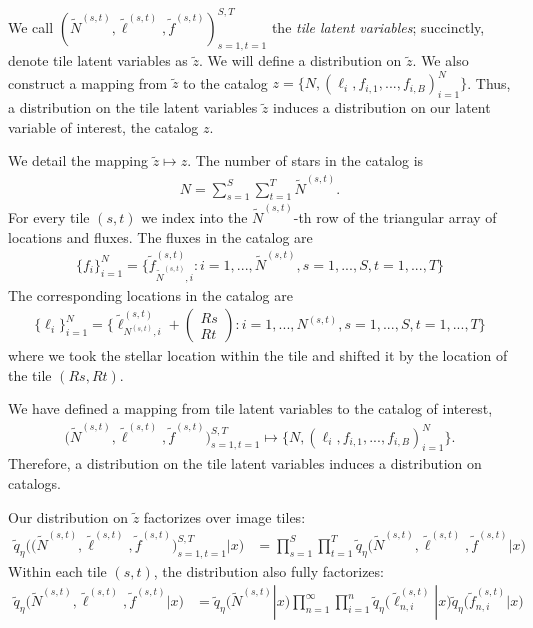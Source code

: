 We call $(\tilde N^{(s, t)}, \tilde \ell^{(s, t)}, \tilde f^{(s, t)})_{s=1,t=1}^{S,T}$ the {\itshape tile latent variables}; 
succinctly, denote tile latent variables as $\tilde z$. 
We will define a distribution on $\tilde z$. 
We also construct a mapping from $\tilde z$ to 
the catalog $z = \{N, (\ell_i, f_{i,1}, ..., f_{i,B})_{i = 1}^N\}$. Thus, a distribution 
on the tile latent variables $\tilde z$ induces 
a distribution on our latent variable of interest, the catalog $z$. 

We detail the mapping $\tilde z\mapsto z$. 
The number of stars in the catalog is 
\begin{align}
    N = \sum_{s=1}^{S}\sum_{t=1}^T \tilde N^{(s, t)}. 
\end{align}
For every tile $(s,t)$ we index into the $\tilde N^{(s,t)}$-th
row of the triangular array of locations and fluxes. 
The fluxes in the catalog are
\begin{align}
    \{f_i\}_{i=1}^N = \Big\{\tilde f_{\tilde N^{(s, t)}, i}^{(s, t)} : i = 1, ..., \tilde N^{(s, t)}, s = 1, ..., S, t = 1, ..., T \Big\}
\end{align}
The corresponding locations in the catalog are 
\begin{align}
    \{\ell_i\}_{i = 1}^N = \Big\{\tilde \ell_{N^{(s, t)}, i}^{(s, t)} + 
    \begin{pmatrix}
    Rs \\ Rt
    \end{pmatrix} 
    : i = 1, ..., N^{(s, t)}, s = 1, ..., S, t = 1, ..., T\Big\}
\end{align}
where we took the stellar location within the tile and shifted it by the location of the tile $(Rs, Rt)$. 

We have defined a mapping from tile latent variables to the catalog of interest, 
\begin{align}
 \big(\tilde N^{(s, t)}, \tilde \ell^{(s, t)}, \tilde f^{(s, t)}\big)_{s=1, t = 1}^{S, T}
\mapsto     
\{N, (\ell_i, f_{i,1}, ..., f_{i,B})_{i = 1}^N\}.
\label{eq:patch_to_full_map}
\end{align}
Therefore, a distribution on the tile latent variables induces a distribution on catalogs. 

Our distribution on $\tilde z$ factorizes over image tiles:
\begin{align}
    \tilde q_\eta\big( \big(\tilde N^{(s, t)}, \tilde \ell^{(s, t)}, \tilde f^{(s, t)}\big)_{s=1, t = 1}^{S, T}|x\big) 
    &=
    \prod_{s = 1}^S \prod_{t=1}^T
    \tilde q_\eta\big(\tilde N^{(s, t)}, \tilde \ell^{(s, t)}, \tilde f^{(s, t)} | x\big)
    \label{eq:factorize_patches}
\end{align}
Within each tile $(s,t)$, the distribution also fully factorizes: 
\begin{align}
    \tilde q_\eta\big(\tilde N^{(s, t)}, \tilde \ell^{(s, t)}, \tilde f^{(s, t)} | x\big)
    &= 
    \tilde q_\eta\big(\tilde N^{(s, t)} | x\big)
    \prod_{n = 1}^\infty \prod_{i = 1}^n 
    \tilde q_\eta\big(\tilde \ell_{n,i}^{(s, t)} | x\big)
    \tilde q_\eta\big(\tilde f_{n,i}^{(s, t)} | x\big)
    \label{eq:factorize_within_patch}
\end{align}

